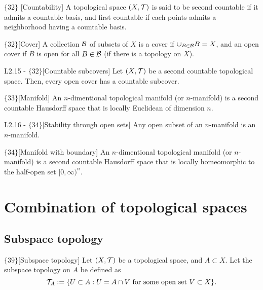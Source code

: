 \documentclass{article}
\begin{document}
\begin{flexidefinition}{$\{32\}$} [Countability]
    A topological space $(X,\mathcal{T})$ is said to be second countable if it admits a countable basis, and first countable if each points admits a neighborhood having a countable basis.
\end{flexidefinition}

\begin{flexidefinition} {$\{32\}$}[Cover]
    A collection $\mathcal{B}$ of subsets of $X$ is a cover if $\cup_{B \in \mathcal{B}} B = X$, and an open cover if $B$ is open for all $B \in \mathcal{B}$ (if there is a topology on $X$).
\end{flexidefinition}

\begin{flexilemma} {L2.15 - $\{32\}$}[Countable subcovers]
    Let $(X,\mathcal{T})$ be a second countable topological space. Then, every open cover has a countable subcover.
\end{flexilemma}

\begin{flexidefinition}{$\{33\}$}[Manifold]
    An $n$-dimentional topological manifold (or $n$-manifold) is a second countable Hausdorff space that is locally Euclidean of dimension $n$.
\end{flexidefinition}

\begin{flexilemma}{L2.16 - $\{34\}$}[Stability through open sets]
    Any open subset of an $n$-manifold is an $n$-manifold.
\end{flexilemma}

\begin{flexidefinition}{$\{34\}$}[Manifold with boundary]
    An $n$-dimentional topological manifold (or $n$-manifold) is a second countable Hausdorff space that is locally homeomorphic to the half-open set $[0,\infty)^n$.
\end{flexidefinition}

\section{Combination of topological spaces}

\subsection{Subspace topology}

\begin{flexilemma}{$\{39\}$}[Subspace topology]
    Let $(X,\mathcal{T})$ be a topological space, and $A \subset X$. Let the subspace topology on $A$ be defined as
    \begin{equation}
        \mathcal{T}_A := \{ U \subset A : U = A \cap V \text{ for some open set } V \subset X\}.
    \end{equation}
\end{flexilemma}
\end{document}
